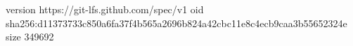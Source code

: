 version https://git-lfs.github.com/spec/v1
oid sha256:d11373733c850a6fa37f4b565a2696b824a42cbc11e8c4ecb9caa3b55652324e
size 349692
